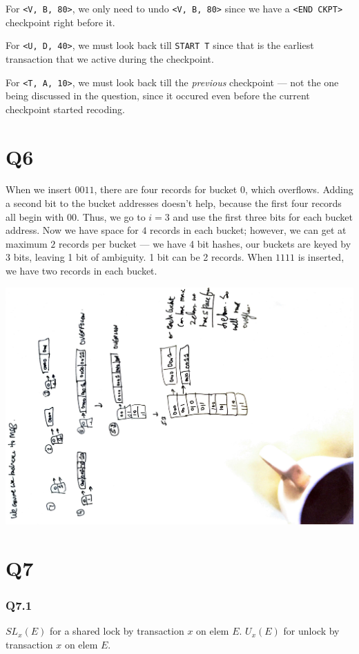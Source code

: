 \documentclass{article}
\begin{document}
For \texttt{<V, B, 80>}, we only need to undo \texttt{<V, B, 80>} since
we have a \texttt{<END CKPT>} checkpoint right before it. 

For \texttt{<U, D, 40>}, we must look back till \texttt{START T} since that
is the earliest transaction that we active during the checkpoint.


For \texttt{<T, A, 10>}, we must look back till the \emph{previous}
checkpoint --- not the one being discussed in the question, since it
occured even before the current checkpoint started recoding.

\section{Q6}

When we insert $0011$, there are four records for bucket 0, which overflows.
Adding a second bit to the bucket addresses doesn't help, because the first
four records all begin with $00$. Thus, we go to $i = 3$ and use the first three
bits for each bucket address. Now we have space for $4$ records in each bucket;
however, we can get at maximum $2$ records per bucket --- we have 4 bit hashes,
our buckets are keyed by 3 bits, leaving 1 bit of ambiguity. 1 bit 
can be 2 records. When $1111$ is inserted, we have two records in each bucket.

\includegraphics[width=\textwidth, angle=270]{db-q6.pdf}

\section{Q7}
\subsubsection{Q7.1}
$SL_x(E)$ for a shared lock by transaction $x$ on elem $E$. $U_x(E)$ for
unlock by transaction $x$ on elem $E$.
\end{document}
